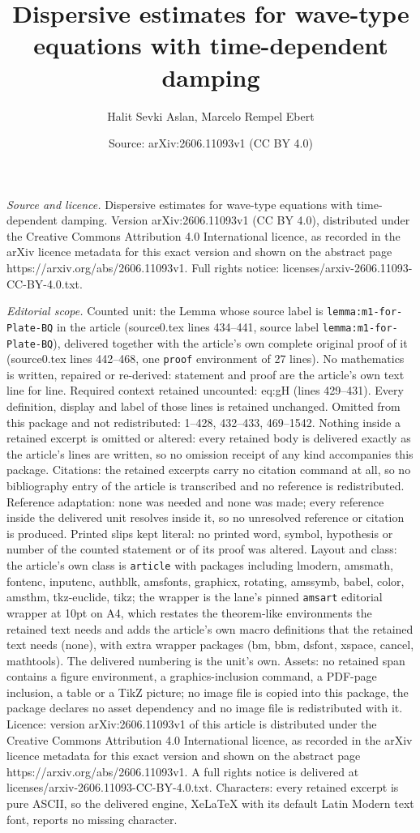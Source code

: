 \documentclass[10pt,a4paper]{amsart}
\title[Dispersive estimates for wave-type equations with time-depen]{Dispersive estimates for wave-type equations with time-dependent damping}
\author{Halit Sevki Aslan, Marcelo Rempel Ebert}
\date{Source: arXiv:2606.11093v1 (CC BY 4.0)}
\begin{document}
\maketitle

\noindent\emph{Source and licence.} Dispersive estimates for wave-type equations with time-dependent damping. Version arXiv:2606.11093v1 (CC BY 4.0), distributed under the Creative Commons Attribution 4.0 International licence, as recorded in the arXiv licence metadata for this exact version and shown on the abstract page https://arxiv.org/abs/2606.11093v1. Full rights notice: licenses/arxiv-2606.11093-CC-BY-4.0.txt.\par\smallskip

\noindent\textit{Editorial scope.} Counted unit: the Lemma whose source label is \texttt{lemma:m1-for-Plate-BQ} in the article (source0.tex lines 434--441, source label \texttt{lemma:m1-for-Plate-BQ}), delivered together with the article's own complete original proof of it (source0.tex lines 442--468, one \texttt{proof} environment of 27 lines). No mathematics is written, repaired or re-derived: statement and proof are the article's own text line for line. Required context retained uncounted: eq:gH (lines 429--431). Every definition, display and label of those lines is retained unchanged. Omitted from this package and not redistributed: 1--428, 432--433, 469--1542. Nothing inside a retained excerpt is omitted or altered: every retained body is delivered exactly as the article's lines are written, so no omission receipt of any kind accompanies this package. Citations: the retained excerpts carry no citation command at all, so no bibliography entry of the article is transcribed and no reference is redistributed. Reference adaptation: none was needed and none was made; every reference inside the delivered unit resolves inside it, so no unresolved reference or citation is produced. Printed slips kept literal: no printed word, symbol, hypothesis or number of the counted statement or of its proof was altered. Layout and class: the article's own class is \texttt{article} with packages including lmodern, amsmath, fontenc, inputenc, authblk, amsfonts, graphicx, rotating, amssymb, babel, color, amsthm, tkz-euclide, tikz; the wrapper is the lane's pinned \texttt{amsart} editorial wrapper at 10pt on A4, which restates the theorem-like environments the retained text needs and adds the article's own macro definitions that the retained text needs (none), with extra wrapper packages (bm, bbm, dsfont, xspace, cancel, mathtools). The delivered numbering is the unit's own. Assets: no retained span contains a figure environment, a graphics-inclusion command, a PDF-page inclusion, a table or a TikZ picture; no image file is copied into this package, the package declares no asset dependency and no image file is redistributed with it. Licence: version arXiv:2606.11093v1 of this article is distributed under the Creative Commons Attribution 4.0 International licence, as recorded in the arXiv licence metadata for this exact version and shown on the abstract page https://arxiv.org/abs/2606.11093v1. A full rights notice is delivered at licenses/arxiv-2606.11093-CC-BY-4.0.txt. Characters: every retained excerpt is pure ASCII, so the delivered engine, XeLaTeX with its default Latin Modern text font, reports no missing character.
\end{document}
